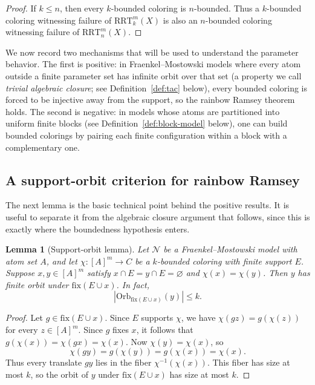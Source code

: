 \documentclass[10pt,a4paper]{amsart}
\newtheorem{lemma}[theorem]{Lemma}
\theoremstyle{definition}
\newcommand{\RRT}{\mathrm{RRT}}
\newcommand{\NN}{\mathcal{N}}
\begin{document}
\begin{proof}
If \(k\leq n\), then every \(k\)-bounded coloring is \(n\)-bounded.  Thus a \(k\)-bounded coloring witnessing failure of \(\RRT^m_k(X)\) is also an \(n\)-bounded coloring witnessing failure of \(\RRT^m_n(X)\).
\end{proof}

We now record two mechanisms that will be used to understand the parameter behavior.  The first is positive: in Fraenkel--Mostowski models where every atom outside a finite parameter set has infinite orbit over that set (a property we call \emph{trivial algebraic closure}; see Definition~\ref{def:tac} below), every bounded coloring is forced to be injective away from the support, so the rainbow Ramsey theorem holds.  The second is negative: in models whose atoms are partitioned into uniform finite blocks (see Definition~\ref{def:block-model} below), one can build bounded colorings by pairing each finite configuration within a block with a complementary one.

\subsection{A support-orbit criterion for rainbow Ramsey}

The next lemma is the basic technical point behind the positive results.  It is useful to separate it from the algebraic closure argument that follows, since this is exactly where the boundedness hypothesis enters.

\begin{lemma}[Support-orbit lemma]
Let \(\NN\) be a Fraenkel--Mostowski model with atom set \(A\), and let \(\chi:[A]^m\to C\) be a \(k\)-bounded coloring with finite support \(E\).  Suppose \(x,y\in[A]^m\) satisfy \(x\cap E=y\cap E=\varnothing\) and \(\chi(x)=\chi(y)\).  Then \(y\) has finite orbit under \(\mathrm{fix}(E\cup x)\).  In fact,
\[
    \left|\mathrm{Orb}_{\mathrm{fix}(E\cup x)}(y)\right|\leq k.
\]
\end{lemma}

\begin{proof}
Let \(g\in\mathrm{fix}(E\cup x)\).  Since \(E\) supports \(\chi\), we have \(\chi(gz)=g(\chi(z))\) for every \(z\in[A]^m\).  Since \(g\) fixes \(x\), it follows that \(g(\chi(x))=\chi(gx)=\chi(x)\).  Now \(\chi(y)=\chi(x)\), so
\[
    \chi(gy)=g(\chi(y))=g(\chi(x))=\chi(x).
\]
Thus every translate \(gy\) lies in the fiber \(\chi^{-1}(\chi(x))\).  This fiber has size at most \(k\), so the orbit of \(y\) under \(\mathrm{fix}(E\cup x)\) has size at most \(k\).
\end{proof}
\end{document}
